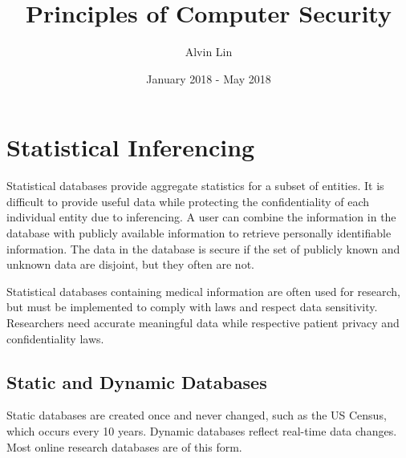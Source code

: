\documentclass{math}
\title{Principles of Computer Security}
\author{Alvin Lin}
\date{January 2018 - May 2018}
\begin{document}
\maketitle

\section*{Statistical Inferencing}
Statistical databases provide aggregate statistics for a subset of entities.
It is difficult to provide useful data while protecting the confidentiality of
each individual entity due to inferencing. A user can combine the information
in the database with publicly available information to retrieve personally
identifiable information. The data in the database is secure if the set of
publicly known and unknown data are disjoint, but they often are not.
\par Statistical databases containing medical information are often used for
research, but must be implemented to comply with laws and respect data
sensitivity. Researchers need accurate meaningful data while respective
patient privacy and confidentiality laws.

\subsection*{Static and Dynamic Databases}
Static databases are created once and never changed, such as the US Census,
which occurs every 10 years. Dynamic databases reflect real-time data changes.
Most online research databases are of this form.
\end{document}

